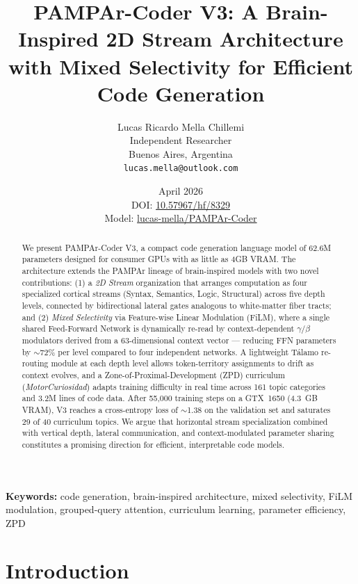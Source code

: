\documentclass[11pt,a4paper]{article}
\title{PAMPAr-Coder V3: A Brain-Inspired 2D Stream Architecture\\
with Mixed Selectivity for Efficient Code Generation}
\author{
Lucas Ricardo Mella Chillemi\\
Independent Researcher\\
Buenos Aires, Argentina\\
\texttt{lucas.mella@outlook.com}
}
\date{April 2026\\[1em]
\small DOI: \href{https://doi.org/10.57967/hf/8329}{10.57967/hf/8329}\\
\small Model: \href{https://huggingface.co/lucas-mella/PAMPAr-Coder}{lucas-mella/PAMPAr-Coder}
}
\begin{document}
\maketitle

\begin{abstract}
We present PAMPAr-Coder V3, a compact code generation language model of 62.6M
parameters designed for consumer GPUs with as little as 4GB VRAM.  The
architecture extends the PAMPAr lineage of brain-inspired models with two novel
contributions: (1) a \textit{2D Stream} organization that arranges computation
as four specialized cortical streams (Syntax, Semantics, Logic, Structural)
across five depth levels, connected by bidirectional lateral gates analogous to
white-matter fiber tracts; and (2) \textit{Mixed Selectivity} via Feature-wise
Linear Modulation (FiLM), where a single shared Feed-Forward Network is
dynamically re-read by context-dependent $\gamma/\beta$ modulators derived from
a 63-dimensional context vector — reducing FFN parameters by $\sim$72\% per
level compared to four independent networks.  A lightweight Tálamo re-routing
module at each depth level allows token-territory assignments to drift as
context evolves, and a Zone-of-Proximal-Development (ZPD) curriculum
(\textit{MotorCuriosidad}) adapts training difficulty in real time across 161
topic categories and 3.2M lines of code data.  After 55,000 training steps on
a GTX~1650 (4.3~GB VRAM), V3 reaches a cross-entropy loss of $\sim$1.38 on the
validation set and saturates 29 of 40 curriculum topics.  We argue that
horizontal stream specialization combined with vertical depth, lateral
communication, and context-modulated parameter sharing constitutes a promising
direction for efficient, interpretable code models.
\end{abstract}

\textbf{Keywords:} code generation, brain-inspired architecture, mixed
selectivity, FiLM modulation, grouped-query attention, curriculum learning,
parameter efficiency, ZPD

\section{Introduction}
\label{sec:introduction}
\end{document}

